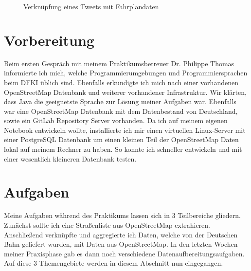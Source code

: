 \begin{figure}
   \centering
   \caption{Verknüpfung eines Tweets mit Fahrplandaten\protect\cite{WEB:SD4M:Presentation:2016}}
   \label{fig:tweetXfahrplan}
 \end{figure}

\section{Vorbereitung}
\label{sec:main:preparation}
Beim ersten Gespräch mit meinem Praktikumsbetreuer Dr. Philippe Thomas informierte ich mich, welche Programmierumgebungen und Programmiersprachen beim DFKI üblich sind.
Ebenfalls erkundigte ich mich nach einer vorhandenen OpenStreetMap Datenbank und weiterer vorhandener Infrastruktur.
Wir klärten, dass Java die geeignetste Sprache zur Lösung meiner Aufgaben war. 
Ebenfalls war eine OpenStreetMap Datenbank mit dem Datenbestand von Deutschland, sowie ein GitLab Repository Server vorhanden.
Da ich auf meinem eigenen Notebook entwickeln wollte, installierte ich mir einen virtuellen Linux-Server mit einer PostgreSQL Datenbank um einen kleinen Teil der OpenStreetMap Daten lokal auf meinem Rechner zu haben.
So konnte ich schneller entwickeln und mit einer wesentlich kleineren Datenbank testen.

\section{Aufgaben}
Meine Aufgaben während des Praktikums lassen sich in 3 Teilbereiche gliedern. Zunächst sollte ich eine Straßenliste aus OpenStreetMap extrahieren. Anschließend verknüpfte und aggregierte ich Daten, welche von der Deutschen Bahn geliefert wurden, mit Daten aus OpenStreetMap. In den letzten Wochen meiner Praxisphase gab es dann noch verschiedene Datenaufbereitungsaufgaben. Auf diese 3 Themengebiete werden in diesem Abschnitt nun eingegangen.

